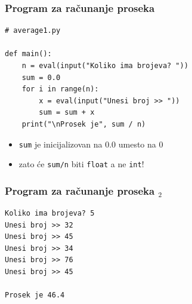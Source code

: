\documentclass[utf8,compress]{beamer}
\begin{document}


\begin{frame}[fragile]
  \frametitle{Program za računanje proseka}
\begin{verbatim}
# average1.py

def main():
    n = eval(input("Koliko ima brojeva? "))
    sum = 0.0
    for i in range(n):
        x = eval(input("Unesi broj >> "))
        sum = sum + x
    print("\nProsek je", sum / n)
\end{verbatim}
  \begin{itemize}
    \item \texttt{sum} je inicijalizovan na 0.0 umesto na 0
    \item zato će \texttt{sum/n} biti \texttt{float} a ne \texttt{int}!
  \end{itemize}
\end{frame}

\begin{frame}[fragile]
  \frametitle{Program za računanje proseka $_2$}
\begin{verbatim}
Koliko ima brojeva? 5
Unesi broj >> 32
Unesi broj >> 45
Unesi broj >> 34
Unesi broj >> 76
Unesi broj >> 45

Prosek je 46.4
\end{verbatim}
\end{frame}
\end{document}
